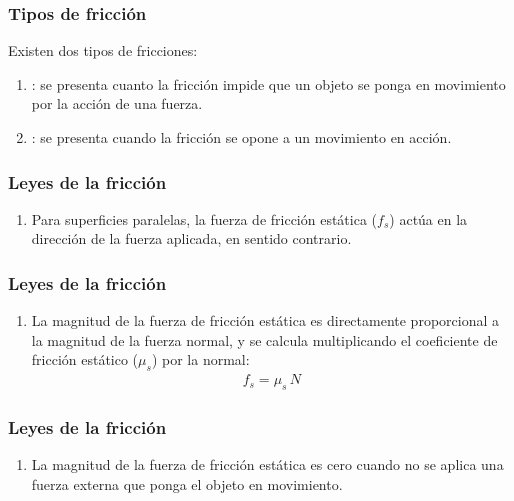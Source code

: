 \documentclass[14pt]{beamer}
\begin{document}
\begin{frame}
\frametitle{Tipos de fricción}
Existen dos tipos de fricciones:
\pause
{}
\begin{enumerate}[<+->]
\item {}: se presenta cuanto la fricción impide que un objeto se ponga en movimiento por la acción de una fuerza.
\item {}: se presenta cuando la fricción se opone a un movimiento en acción.
\end{enumerate}
\end{frame}
\begin{frame}
\frametitle{Leyes de la fricción}
\begin{enumerate}[<+->]
\item Para superficies paralelas, la fuerza de fricción estática ($f_{s}$) actúa en la dirección de la fuerza aplicada, en sentido contrario.
\seti
\end{enumerate}
\end{frame}
\begin{frame}
\frametitle{Leyes de la fricción}
\begin{enumerate}[<+->]
\conti
\item La magnitud de la fuerza de fricción estática es directamente proporcional a la magnitud de la fuerza normal, y se calcula multiplicando el coeficiente de fricción estático ($\mu_{s}$) por la normal:
\begin{align*}
f_{s} = \mu_{s} \, N
\end{align*}
\seti
\end{enumerate}
\end{frame}
\begin{frame}
\frametitle{Leyes de la fricción}
\begin{enumerate}[<+->]
\conti
\item La magnitud de la fuerza de fricción estática es cero cuando no se aplica una fuerza externa que ponga el objeto en movimiento.
\seti
\end{enumerate}
\end{frame}
\end{document}
